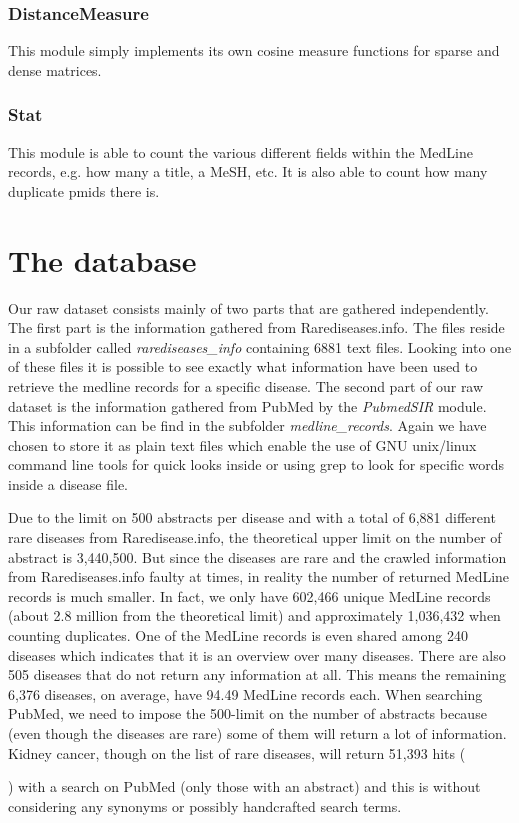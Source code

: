 \subsubsection{DistanceMeasure}
This module simply implements its own cosine measure functions for
sparse and dense matrices.

\subsubsection{Stat}
This module is able to count the various different fields within the
MedLine records, e.g. how many a title, a MeSH, etc. It is also
able to count how many duplicate pmids there is.

\section{The database\label{Database}}

Our raw dataset consists mainly of two parts that are gathered
independently. The first part is the information gathered from
Rarediseases.info. The files reside in a subfolder called
\textit{rarediseases\_info} containing 6881 text files. Looking into
one of these files it is possible to see exactly what information have
been used to retrieve the medline records for a specific disease. The
second part of our raw dataset is the information gathered from PubMed
by the \textit{PubmedSIR} module. This information can be find in the subfolder
\textit{medline\_records}. Again we have chosen to store it as plain
text files which enable the use of GNU unix/linux command line tools
for quick looks inside or using grep to look for specific words inside
a disease file.

Due to the limit on 500 abstracts per disease and with a total of
6,881 different rare diseases from Raredisease.info, the theoretical
upper limit on the number of abstract is 3,440,500. But since the
diseases are rare and the crawled information from Rarediseases.info
faulty at times, in reality the number of returned MedLine records is
much smaller. In fact, we only have 602,466 unique MedLine records
(about 2.8 million from the theoretical limit) and approximately
1,036,432 when counting duplicates. One of the MedLine records is even
shared among 240 diseases which indicates that it is an overview over
many diseases. There are also 505 diseases that do not return any
information at all. This means the remaining 6,376 diseases, on
average, have 94.49 MedLine records each. When searching PubMed, we
need to impose the 500-limit on the number of abstracts because (even
though the diseases are rare) some of them will return a lot of
information. Kidney cancer, though on the list of rare diseases, will
return 51,393 hits (\date{January 3, 2010}) with a search on PubMed
(only those with an abstract) and this is without considering any
synonyms or possibly handcrafted search terms.

